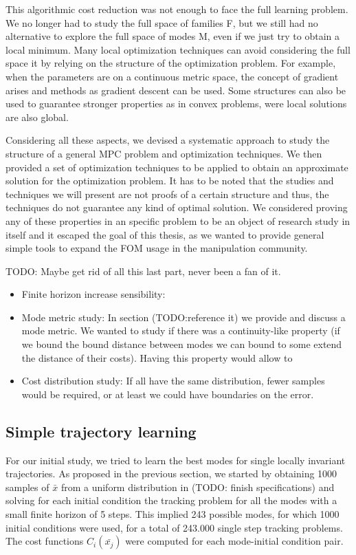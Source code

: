 \documentclass[12,twoside]{TFG-GM}
\theoremstyle{definition}
\theoremstyle{remark}
\newcommand*\diff[1]{\bar{#1}}
\begin{document}
This algorithmic cost reduction was not enough to face the full learning problem. We no longer had to study the full space of families F, but we still had no alternative to explore the full space of modes M, even if we just try to obtain a local minimum. Many local optimization techniques can avoid considering the full space it by relying on the structure of the optimization problem. For example, when the parameters are on a continuous metric space, the concept of gradient arises and methods as gradient descent can be used. Some structures can also be used to guarantee stronger properties as in convex problems, were local solutions are also global.

Considering all these aspects, we devised a systematic approach to study the structure of a general MPC problem and optimization techniques. We then provided a set of optimization techniques to be applied to obtain an approximate solution for the optimization problem. It has to be noted that the studies and techniques we will present are not proofs of a certain structure and thus, the techniques do not guarantee any kind of optimal solution. We considered proving any of these properties in an specific problem to be an object of research study in itself and it escaped the goal of this thesis, as we wanted to provide general simple tools to expand the FOM usage in the manipulation community.

TODO: Maybe get rid of all this last part, never been a fan of it.
\begin{itemize}
\item {Finite horizon increase sensibility:}
\item {Mode metric study:} In section (TODO:reference it) we provide and discuss a mode metric. We wanted to study if there was a continuity-like property (if we bound the bound distance between modes we can bound to some extend the distance of their costs). Having this property would allow to 
\item {Cost distribution study:} If all have the same distribution, fewer samples would be required, or at least we could have boundaries on the error.
\end{itemize}

\subsection{Simple trajectory learning}
\label{subsec:learningsimple}
For our initial study, we tried to learn the best modes for single locally invariant trajectories. As proposed in the previous section, we started by obtaining 1000 samples of $\diff{x}$ from a uniform distribution in (TODO: finish specifications) and solving for each initial condition the tracking problem for all the modes with a small finite horizon of 5 steps. This implied 243 possible modes, for which 1000 initial conditions were used, for a total of 243.000 single step tracking problems. The cost functions $C_i(\diff{x_j})$ were computed for each mode-initial condition pair.
\end{document}

